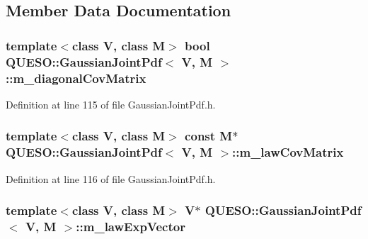 \subsection{Member Data Documentation}
\hypertarget{class_q_u_e_s_o_1_1_gaussian_joint_pdf_a7e18c86c60bd7dc4ceaadaab618c3241}{
\subsubsection[{m\-\_\-diagonal\-Cov\-Matrix}]{\setlength{\rightskip}{0pt plus 5cm}template$<$class V, class M$>$ bool {\bf Q\-U\-E\-S\-O\-::\-Gaussian\-Joint\-Pdf}$<$ V, M $>$\-::m\-\_\-diagonal\-Cov\-Matrix\hspace{0.3cm}{\ttfamily [protected]}}}\label{class_q_u_e_s_o_1_1_gaussian_joint_pdf_a7e18c86c60bd7dc4ceaadaab618c3241}


Definition at line 115 of file Gaussian\-Joint\-Pdf.\-h.

\hypertarget{class_q_u_e_s_o_1_1_gaussian_joint_pdf_af13b72027783d8db03721951a71087d8}{
\subsubsection[{m\-\_\-law\-Cov\-Matrix}]{\setlength{\rightskip}{0pt plus 5cm}template$<$class V, class M$>$ const M$\ast$ {\bf Q\-U\-E\-S\-O\-::\-Gaussian\-Joint\-Pdf}$<$ V, M $>$\-::m\-\_\-law\-Cov\-Matrix\hspace{0.3cm}{\ttfamily [protected]}}}\label{class_q_u_e_s_o_1_1_gaussian_joint_pdf_af13b72027783d8db03721951a71087d8}


Definition at line 116 of file Gaussian\-Joint\-Pdf.\-h.

\hypertarget{class_q_u_e_s_o_1_1_gaussian_joint_pdf_a8ef2407f5234ce5e0ed0d05a21f183e5}{
\subsubsection[{m\-\_\-law\-Exp\-Vector}]{\setlength{\rightskip}{0pt plus 5cm}template$<$class V, class M$>$ V$\ast$ {\bf Q\-U\-E\-S\-O\-::\-Gaussian\-Joint\-Pdf}$<$ V, M $>$\-::m\-\_\-law\-Exp\-Vector\hspace{0.3cm}{\ttfamily [protected]}}}\label{class_q_u_e_s_o_1_1_gaussian_joint_pdf_a8ef2407f5234ce5e0ed0d05a21f183e5}


